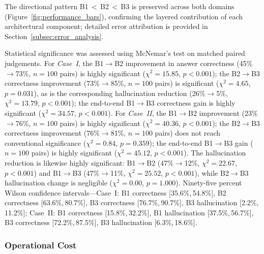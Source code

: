 \documentclass[largeformat]{interact}
\begin{document}
The directional pattern B1\,$<$\,B2\,$<$\,B3 is preserved across both domains (Figure~\ref{fig:performance_bars}), confirming the layered contribution of each architectural component; detailed error attribution is provided in Section~\ref{subsec:error_analysis}.

Statistical significance was assessed using McNemar's test on matched paired judgements. For \textit{Case~I}, the B1$\rightarrow$B2 improvement in answer correctness (45\%$\rightarrow$73\%, $n = 100$ pairs) is highly significant ($\chi^2 = 15.85$, $p < 0.001$); the B2$\rightarrow$B3 correctness improvement (73\%$\rightarrow$85\%, $n = 100$ pairs) is significant ($\chi^2 = 4.65$, $p = 0.031$), as is the corresponding hallucination reduction (26\%$\rightarrow$5\%, $\chi^2 = 13.79$, $p < 0.001$); the end-to-end B1$\rightarrow$B3 correctness gain is highly significant ($\chi^2 = 34.57$, $p < 0.001$).
For \textit{Case~II}, the B1$\rightarrow$B2 improvement (23\%$\rightarrow$76\%, $n = 100$ pairs) is highly significant ($\chi^2 = 40.36$, $p < 0.001$); the B2$\rightarrow$B3 correctness improvement (76\%$\rightarrow$81\%, $n = 100$ pairs) does not reach conventional significance ($\chi^2 = 0.84$, $p = 0.359$); the end-to-end B1$\rightarrow$B3 gain ($n = 100$ pairs) is highly significant ($\chi^2 = 45.12$, $p < 0.001$). The hallucination reduction is likewise highly significant: B1$\rightarrow$B2 (47\%$\rightarrow$12\%, $\chi^2 = 22.67$, $p < 0.001$) and B1$\rightarrow$B3 (47\%$\rightarrow$11\%, $\chi^2 = 25.52$, $p < 0.001$), while B2$\rightarrow$B3 hallucination change is negligible ($\chi^2 = 0.00$, $p = 1.000$). Ninety-five percent Wilson confidence intervals---Case~I: B1 correctness [35.6\%,\,54.8\%], B2 correctness [63.6\%,\,80.7\%], B3 correctness [76.7\%,\,90.7\%], B3 hallucination [2.2\%,\,11.2\%]; Case~II: B1 correctness [15.8\%,\,32.2\%], B1 hallucination [37.5\%,\,56.7\%], B3 correctness [72.2\%,\,87.5\%], B3 hallucination [6.3\%,\,18.6\%].



\subsubsection{Operational Cost}
\label{subsubsec:operational_cost}
\end{document}
